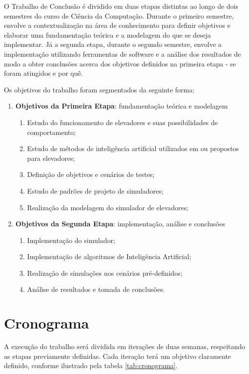 O Trabalho de Conclusão é dividido em duas etapas distintas ao longo de dois
semestres do curso de Ciência da Computação. Durante o primeiro semestre,
envolve a contextualização na área de conhecimento para definir objetivos e
elaborar uma fundamentação teórica e a modelagem do que se deseja implementar.
Já a segunda etapa, durante o segundo semestre, envolve a implementação
utilizando ferramentas de software e a análise dos resultados de modo a obter
conclusões acerca dos objetivos definidos na primeira etapa - se foram atingidos
e por quê.

Os objetivos do trabalho foram segmentados da seguinte forma:

\begin{enumerate}
  \item \textbf{Objetivos da Primeira Etapa}: fundamentação teórica e modelagem
  \begin{enumerate}[label*=\arabic*.]
    \item Estudo do funcionamento de elevadores e suas possibilidades de
          comportamento;
    \item Estudo de métodos de inteligência artificial utilizados em ou
          propostos para elevadores;
    \item Definição de objetivos e cenários de testes;
    \item Estudo de padrões de projeto de simuladores;
    \item Realização da modelagem do simulador de elevadores;
  \end{enumerate}
  \item \textbf{Objetivos da Segunda Etapa}: implementação, análise e conclusões
  \begin{enumerate}[label*=\arabic*.]
    \item Implementação do simulador;
    \item Implementação de algoritmos de Inteligência Artificial;
    \item Realização de simulações nos cenários pré-definidos;
    \item Análise de resultados e tomada de conclusões.
  \end{enumerate}
\end{enumerate}

\section{\label{section:schedule}Cronograma}

A execução do trabalho será dividida em iterações de duas semanas, respeitando
as etapas previamente definidas. Cada iteração terá um objetivo claramente
definido, conforme ilustrado pela tabela \ref{tab:cronograma}.

